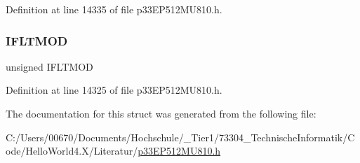 Definition at line 14335 of file p33\+E\+P512\+M\+U810.\+h.

\mbox{\label{structtag_f_c_l_c_o_n2_b_i_t_s_a4573eed251d96a98a6b5ba1c7cc30451}} 
\subsubsection{\texorpdfstring{I\+F\+L\+T\+M\+OD}{IFLTMOD}}
{\footnotesize\ttfamily unsigned I\+F\+L\+T\+M\+OD}



Definition at line 14325 of file p33\+E\+P512\+M\+U810.\+h.



The documentation for this struct was generated from the following file\+:\begin{DoxyCompactItemize}
\item 
C\+:/\+Users/00670/\+Documents/\+Hochschule/\+\_\+\+Tier1/73304\+\_\+\+Technische\+Informatik/\+Code/\+Hello\+World4.\+X/\+Literatur/\hyperlink{p33_e_p512_m_u810_8h}{p33\+E\+P512\+M\+U810.\+h}\end{DoxyCompactItemize}
